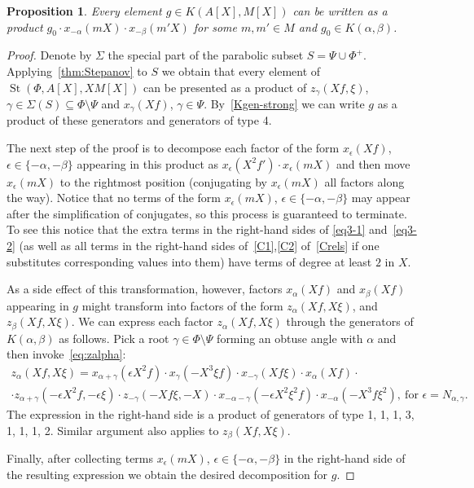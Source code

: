 \documentclass[oneside, 8pt]{amsart}
\newtheorem{prop}{Proposition}
\theoremstyle{remark}
\theoremstyle{definition}
\DeclareMathOperator{\St}{St}
\numberwithin{equation}{section}
\begin{document}
\begin{prop} \label{K-a-b}
 Every element $g \in K(A[X], M[X])$ can be written as a product $g_0 \cdot x_{-\alpha}(mX) \cdot x_{-\beta}(m'X)$ for some $m, m' \in M$ and $g_0 \in K(\alpha, \beta)$.
\end{prop}
\begin{proof}
 Denote by $\Sigma$ the special part of the parabolic subset $S = \Psi \cup \Phi^+$.
 Applying~\cref{thm:Stepanov} to $S$ we obtain that every element of $\St(\Phi, A[X], XM[X])$ can be presented as a product of 
  $z_\gamma(Xf, \xi)$, $\gamma \in \Sigma(S) \subseteq \Phi\setminus \Psi$ and $x_\gamma(Xf)$, $\gamma \in \Psi$.
 By~\cref{Kgen-strong} we can write $g$ as a product of these generators and generators of type 4.
  
 The next step of the proof is to decompose each factor of the form $x_{\epsilon}(Xf)$, $\epsilon \in \{-\alpha,-\beta\}$ appearing in this product as
 $x_{\epsilon}(X^2f') \cdot x_{\epsilon}(mX)$ and then move $x_{\epsilon}(mX)$ to the rightmost position
  (conjugating by $x_{\epsilon}(mX)$ all factors along the way).
 Notice that no terms of the form $x_{\epsilon}(mX)$, $\epsilon \in \{ -\alpha, -\beta \}$ may appear after the simplification of conjugates,
  so this process is guaranteed to terminate.
 To see this notice that the extra terms in the right-hand sides of \eqref{eq3-1} and~\eqref{eq3-2} 
 (as well as all terms in the right-hand sides of~\eqref{C1},\eqref{C2} of~\cref{Crels} if one substitutes corresponding values into them)
  have terms of degree at least $2$ in $X$. 
  
 As a side effect of this transformation, however, factors $x_\alpha(Xf)$ and $x_\beta(Xf)$ appearing in $g$ might transform into factors of the form $z_\alpha(Xf, X\xi)$, and $z_\beta(Xf, X\xi)$. We can express each factor $z_\alpha(Xf, X\xi)$ through the generators of $K(\alpha, \beta)$ as follows. Pick a root $\gamma \in \Phi\setminus \Psi$ forming an obtuse angle with $\alpha$ and then invoke~\eqref{eq:zalpha}:
 \begin{multline}
  z_\alpha(Xf, X\xi) = x_{\alpha+\gamma}(\epsilon X^2f) \cdot x_{\gamma}(-X^3 \xi f) \cdot x_{-\gamma}(Xf\xi) \cdot x_\alpha(Xf) \cdot \\ \cdot z_{\alpha+\gamma}(-\epsilon X^2 f, -\epsilon \xi) \cdot z_{-\gamma}(-Xf\xi, -X) \cdot x_{-\alpha-\gamma}(-\epsilon X^2\xi^2 f) \cdot x_{-\alpha}(-X^3 f \xi^2),\ \text{for } \epsilon = N_{\alpha, \gamma}.
 \end{multline}
 The expression in the right-hand side is a product of generators of type 1, 1, 1, 3, 1, 1, 1, 2. Similar argument also applies to $z_\beta(Xf, X\xi)$.  
 
 Finally, after collecting terms $x_\epsilon(mX)$, $\epsilon \in \{ -\alpha, -\beta \}$ in the right-hand side of the resulting expression
  we obtain the desired decomposition for $g$. \end{proof}
\end{document}
